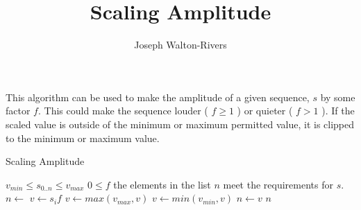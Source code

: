 \documentclass{../fal_assignment}
\title{Scaling Amplitude}
\author{Joseph Walton-Rivers}
\begin{document}
\maketitle
	This algorithm can be used to make the amplitude of a given sequence, $s$ by some factor $f$. This could make the sequence louder ( $f \ge 1$ ) or quieter ( $f > 1$ ). If the scaled value is outside of the minimum or maximum permitted value, it is clipped to the minimum or maximum value.

\begin{algorithm}[ht]
	\caption{Scaling Amplitude}
	\label{alg:algorithm}
	
	\begin{algorithmic}[1]
		\Require
		\Statex $v_{min} \le s_{0..n} \le v_{max}$
		\Statex $0 \le f$
		\Ensure
		\Statex the elements in the list $n$ meet the requirements for $s$.
		\State $n\gets$ 
		\State $v\gets s_if$
		\State $v\gets max(v_{max}, v)$
		\State $v\gets min(v_{min}, v)$
		\State $n\gets v$
		\EndFor
		\State \Return $n$
		\EndFunction
	\end{algorithmic}
\end{algorithm}
\end{document}
